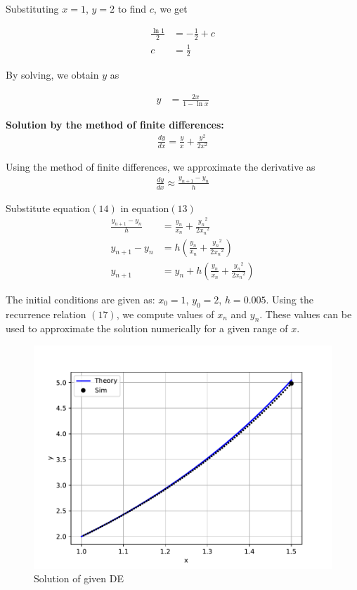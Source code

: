 \documentclass[journal,12pt,onecolumn]{IEEEtran}
\theoremstyle{remark}
\begin{document}
Substituting $x = 1$, $y = 2$ to find $c$, we get

\begin{align}
    \frac{\ln{1}}{2} &= -\frac{1}{2} + c \\
    c &= \frac{1}{2}
\end{align}

By solving, we obtain $y$ as

\begin{align}
    y &= \frac{2x}{1 - \ln{x}}
\end{align}

\textbf{Solution by the method of finite differences:}\\
\begin{align}
    \frac{dy}{dx} = \frac{y}{x} + \frac{y^2}{2x^2}
\end{align}

Using the method of finite differences, we approximate the derivative as
\begin{align}
    \frac{dy}{dx} \approx \frac{y_{n+1} - y_n}{h}
\end{align}
 
Substitute equation$(14)$ in equation$(13)$
\begin{align}
	\frac{y_{n+1} - y_n}{h} &=  \frac{y_n}{x_n} + \frac{{y_n}^2}{2{x_n}^2}\\
	y_{n+1}-y_n &= h  (\frac{y_n}{x_n} + \frac{{y_n}^2}{2{x_n}^2})\\
	y_{n+1} &= y_n+h(\frac{y_n}{x_n} + \frac{{y_n}^2}{2{x_n}^2})
\end{align}

The initial conditions are given as:  $x_0 = 1$, $y_0 = 2$, $h=0.005$. Using the recurrence relation $(17)$, we compute values of $x_n$ and $y_n$. These values can be used to approximate the solution numerically for a given range of $x$.

\begin{figure}[h]
	\centering
	\includegraphics[width=\columnwidth]{figs/fig.pdf}
	\caption{Solution of given DE}
	\label{fig}
\end{figure}
\end{document}
